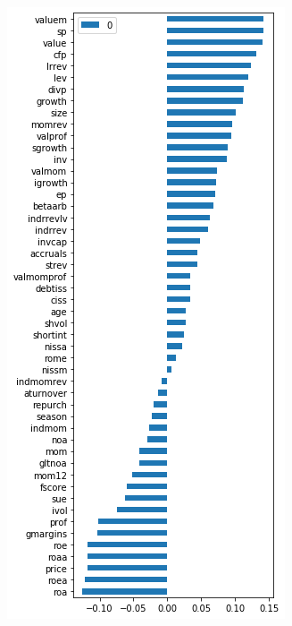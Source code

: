 \documentclass{article}
\begin{document}
\begin{figure}[h]
\centering
\begin{minipage}{.5\textwidth}
  \centering
  \includegraphics[width=.8\linewidth]{Figure_PC1.png}
  \label{eig3}
\end{minipage}%
\begin{minipage}{.5\textwidth}
  \centering

\end{minipage}
\end{figure}
\end{document}
